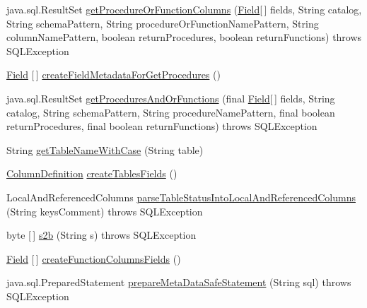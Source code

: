 \begin{DoxyCompactItemize}
\item 
java.\+sql.\+Result\+Set \mbox{\hyperlink{classcom_1_1mysql_1_1cj_1_1jdbc_1_1_database_meta_data_ac29d34a30c88e14cc504dbfffc86d2bd}{get\+Procedure\+Or\+Function\+Columns}} (\mbox{\hyperlink{classcom_1_1mysql_1_1cj_1_1result_1_1_field}{Field}}\mbox{[}$\,$\mbox{]} fields, String catalog, String schema\+Pattern, String procedure\+Or\+Function\+Name\+Pattern, String column\+Name\+Pattern, boolean return\+Procedures, boolean return\+Functions)  throws S\+Q\+L\+Exception 
\item 
\mbox{\hyperlink{classcom_1_1mysql_1_1cj_1_1result_1_1_field}{Field}} \mbox{[}$\,$\mbox{]} \mbox{\hyperlink{classcom_1_1mysql_1_1cj_1_1jdbc_1_1_database_meta_data_a69998cb9f2ac65c2120b05a846081a05}{create\+Field\+Metadata\+For\+Get\+Procedures}} ()
\item 
java.\+sql.\+Result\+Set \mbox{\hyperlink{classcom_1_1mysql_1_1cj_1_1jdbc_1_1_database_meta_data_a9dfc457702844c3d5e8a014b125f9199}{get\+Procedures\+And\+Or\+Functions}} (final \mbox{\hyperlink{classcom_1_1mysql_1_1cj_1_1result_1_1_field}{Field}}\mbox{[}$\,$\mbox{]} fields, String catalog, String schema\+Pattern, String procedure\+Name\+Pattern, final boolean return\+Procedures, final boolean return\+Functions)  throws S\+Q\+L\+Exception 
\item 
String \mbox{\hyperlink{classcom_1_1mysql_1_1cj_1_1jdbc_1_1_database_meta_data_adc22cdd9a86edccdfef36c2048b66bfb}{get\+Table\+Name\+With\+Case}} (String table)
\item 
\mbox{\hyperlink{interfacecom_1_1mysql_1_1cj_1_1protocol_1_1_column_definition}{Column\+Definition}} \mbox{\hyperlink{classcom_1_1mysql_1_1cj_1_1jdbc_1_1_database_meta_data_a17ea33b4514108559a3860e8abacb7ad}{create\+Tables\+Fields}} ()
\item 
Local\+And\+Referenced\+Columns \mbox{\hyperlink{classcom_1_1mysql_1_1cj_1_1jdbc_1_1_database_meta_data_a9a3bd2cd8affbc09ea36b63fb2ef22fe}{parse\+Table\+Status\+Into\+Local\+And\+Referenced\+Columns}} (String keys\+Comment)  throws S\+Q\+L\+Exception 
\item 
byte \mbox{[}$\,$\mbox{]} \mbox{\hyperlink{classcom_1_1mysql_1_1cj_1_1jdbc_1_1_database_meta_data_a23ae1936e5c32dc95c519cd9b5080b75}{s2b}} (String s)  throws S\+Q\+L\+Exception 
\item 
\mbox{\hyperlink{classcom_1_1mysql_1_1cj_1_1result_1_1_field}{Field}} \mbox{[}$\,$\mbox{]} \mbox{\hyperlink{classcom_1_1mysql_1_1cj_1_1jdbc_1_1_database_meta_data_a1b2ad2509b2f089d873bdcf04214472d}{create\+Function\+Columns\+Fields}} ()
\item 
java.\+sql.\+Prepared\+Statement \mbox{\hyperlink{classcom_1_1mysql_1_1cj_1_1jdbc_1_1_database_meta_data_a41de275819e636320ff5ec1c8b30d03d}{prepare\+Meta\+Data\+Safe\+Statement}} (String sql)  throws S\+Q\+L\+Exception 
\end{DoxyCompactItemize}
